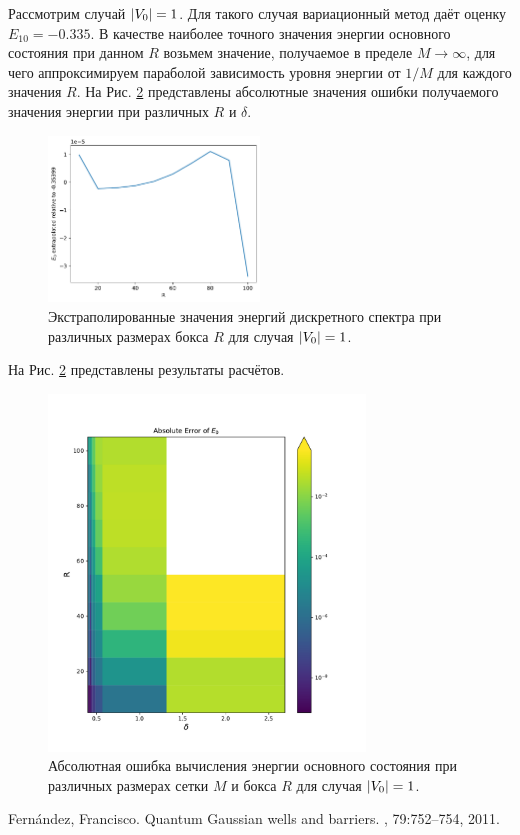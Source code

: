 \documentclass[10pt]{article}
\begin{document}
Рассмотрим случай $\abs{V_0}=1$. Для такого случая вариационный метод даёт оценку $E_10= -0.335$. В качестве наиболее точного значения энергии основного состояния при данном $R$ возьмем значение, получаемое в пределе $M\rightarrow \infty$, для чего аппроксимируем параболой зависимость уровня энергии от $1/M$ для каждого значения $R$. На Рис. \ref{fig:abserr} представлены абсолютные значения ошибки получаемого значения энергии при различных $R$ и $\delta$.
\begin{figure}[htbp]
	\centering
	\includegraphics[width=0.5\textwidth]{../figures/E0_extrapolated}
	\caption{Экстраполированные значения энергий дискретного спектра при различных размерах бокса $R$ для случая $\abs{V_0}=1$.}
	\label{fig:E0_extrapolated}
\end{figure}
На Рис. \ref{fig:abserr} представлены результаты расчётов.
\begin{figure}[htbp]
    \centering
    \includegraphics[width=0.75\textwidth]{../figures/abserr}
    \caption{Абсолютная ошибка вычисления энергии основного состояния при различных размерах сетки $M$ и бокса $R$ для случая $\abs{V_0}=1$.}
    \label{fig:abserr}
\end{figure}

\begin{thebibliography}{10}
    Fernández, Francisco.
    \newblock Quantum Gaussian wells and barriers.
    , 79:752--754, 2011.
\end{thebibliography}
\end{document}
